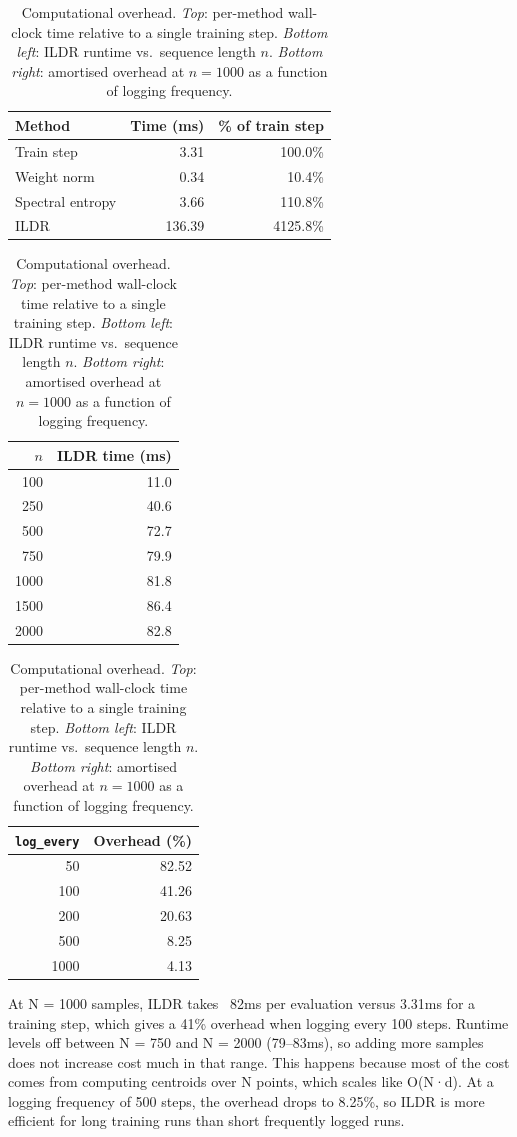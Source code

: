 \documentclass{article}
\begin{document}
\begin{table}[H]
\centering

\begin{tabular}{lrr}
\hline
Method & Time (ms) & \% of train step \\
\hline
Train step       &   3.31 & 100.0\% \\
Weight norm      &   0.34 &  10.4\% \\
Spectral entropy &   3.66 & 110.8\% \\
ILDR             & 136.39 & 4125.8\% \\
\hline
\end{tabular}

\vspace{0.8em}

\begin{tabular}{rr}
\hline
$n$ & ILDR time (ms) \\
\hline
100  &  11.0 \\
250  &  40.6 \\
500  &  72.7 \\
750  &  79.9 \\
1000 &  81.8 \\
1500 &  86.4 \\
2000 &  82.8 \\
\hline
\end{tabular}
\hspace{2em}
\begin{tabular}{rr}
\hline
\texttt{log\_every} & Overhead (\%) \\
\hline
50   & 82.52 \\
100  & 41.26 \\
200  & 20.63 \\
500  &  8.25 \\
1000 &  4.13 \\
\hline
\end{tabular}

\caption{Computational overhead. \textit{Top}: per-method wall-clock time
relative to a single training step. \textit{Bottom left}: ILDR runtime vs.\
sequence length $n$. \textit{Bottom right}: amortised overhead at $n{=}1000$
as a function of logging frequency.}
\label{tab:compute_overhead}
\end{table}

At N = 1000 samples, ILDR takes ~82ms per evaluation versus 3.31ms for a training step, which gives a 41\% overhead when logging every 100 steps. Runtime levels off between N = 750 and N = 2000 (79–83ms), so adding more samples does not increase cost much in that range. This happens because most of the cost comes from computing centroids over N points, which scales like O(N·d). At a logging frequency of 500 steps, the overhead drops to 8.25\%, so ILDR is more efficient for long training runs than short frequently logged runs.
\end{document}
